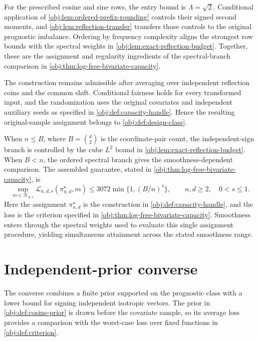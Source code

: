 \documentclass[11pt]{article}
\begin{document}
For the prescribed cosine and sine rows, the entry bound is \(\Lambda=\sqrt2\). Conditional application of \cref{obj:lem:ordered-prefix-rounding} controls their signed second moments, and \cref{obj:lem:reflection-transfer} transfers those controls to the original prognostic imbalance. Ordering by frequency complexity aligns the strongest row bounds with the spectral weights in \cref{obj:lem:exact-reflection-budget}. Together, these are the assignment and regularity ingredients of the spectral-branch comparison in \cref{obj:thm:log-free-bivariate-capacity}.

The construction remains admissible after averaging over independent reflection coins and the common shift. Conditional fairness holds for every transformed input, and the randomization uses the original covariates and independent auxiliary seeds as specified in \cref{obj:def:capacity-handle}. Hence the resulting original-sample assignment belongs to \cref{obj:def:design-class}.

When \(n\leq B\), where \(B=\binom d2\) is the coordinate-pair count, the independent-sign branch is controlled by the cube \(L^2\) bound in \cref{obj:lem:exact-reflection-budget}. When \(B<n\), the ordered spectral branch gives the smoothness-dependent comparison. The assembled guarantee, stated in \cref{obj:thm:log-free-bivariate-capacity}, is
\[
\sup_{m\in\mathcal H_{d,s}}
\mathcal L_{n,d,s}(\pi^\star_{n,d},m)
\leq
3072\min\{1,(B/n)^s\},
\qquad n,d\geq2,\quad 0<s\leq1.
\]
Here the assignment \(\pi^\star_{n,d}\) is the construction in \cref{obj:def:capacity-handle}, and the loss is the criterion specified in \cref{obj:thm:log-free-bivariate-capacity}. Smoothness enters through the spectral weights used to evaluate this single assignment procedure, yielding simultaneous attainment across the stated smoothness range.


\section{Independent-prior converse}

The converse combines a finite prior supported on the prognostic class with a lower bound for signing independent isotropic vectors. The prior in \cref{obj:def:cosine-prior} is drawn before the covariate sample, so its average loss provides a comparison with the worst-case loss over fixed functions in \cref{obj:def:criterion}.
\end{document}
